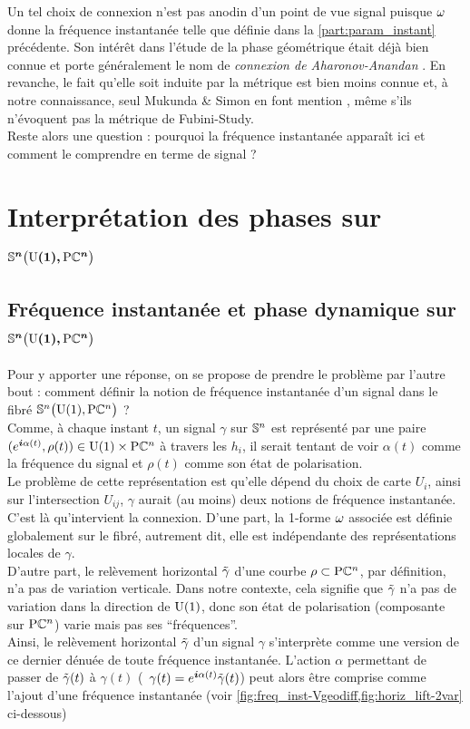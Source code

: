 Un tel choix de connexion n'est pas anodin d'un point de vue signal puisque $\conn$ donne la fréquence instantanée telle que définie dans la \cref{part:param_instant} précédente.
Son intérêt dans l'étude de la phase géométrique était déjà bien connue et porte généralement le nom de \emph{connexion de Aharonov-Anandan} \cite[sec. 4.2]{bohm_geometric_2003}. En revanche, le fait qu'elle soit induite par la métrique est bien moins connue et, à notre connaissance, seul Mukunda \& Simon en font mention \cite{mukunda_quantum_1993}, même s'ils n'évoquent pas la métrique de Fubini-Study.
\\
Reste alors une question : pourquoi la fréquence instantanée apparaît ici et comment le comprendre en terme de signal ?
\\




\section{Interprétation des phases sur $\bf{\VFP}$} \label{sec:phases_dans_VFP}

\subsection{Fréquence instantanée et phase dynamique sur $\bf{\VFP}$}


Pour y apporter une réponse, on se propose de prendre le problème par l'autre bout : comment définir la notion de fréquence instantanée d'un signal dans le fibré $\VFP$ ?
\\
 
Comme, à chaque instant $t$, un signal $\gamma$ sur $\S{n}$ est représenté par une paire $(e^{\i \alpha(t)}, \rho(t))\in\U{1}\times\PC{n}$ à travers les $h_i$,  il serait tentant de voir $\alpha(t)$ comme la fréquence du signal et $\rho(t)$ comme son état de polarisation.
\\
Le problème de cette représentation est qu'elle dépend du choix de carte $U_i$, ainsi sur l'intersection $U_{ij}$, $\gamma$ aurait (au moins) deux notions de fréquence instantanée.
\\

C'est là qu'intervient la connexion. D'une part, la 1-forme $\conn$ associée est définie globalement sur le fibré, autrement dit, elle est indépendante des représentations locales de $\gamma$.
\\
D'autre part, le relèvement horizontal $\Tilde{\gamma}$ d'une courbe $\rho\subset\PC{n}$, par définition, n'a pas de variation verticale. Dans notre contexte, cela signifie que $\Tilde{\gamma}$ n'a pas de variation dans la direction de $\U{1}$, donc son état de polarisation (composante sur $\PC{n}$) varie mais pas ses ``fréquences''.
\\
Ainsi, le relèvement horizontal $\Tilde{\gamma}$ d'un signal $\gamma$ s'interprète comme une version de ce dernier dénuée de toute fréquence instantanée.
L'action $\alpha$ permettant de passer de $\Tilde{\gamma}(t)$ à $\gamma(t)$ (\ie~$\gamma(t) = e^{\i \alpha(t)} \Tilde{\gamma}(t)$) peut alors être comprise comme l'ajout d'une fréquence instantanée (voir \cref{fig:freq_inst-Vgeodiff,fig:horiz_lift-2var} ci-dessous)	
\\

